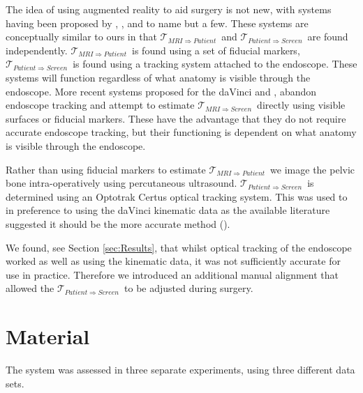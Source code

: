 \documentclass[3p,twocolumn,preprint,10pt]{elsarticle}
\newcommand{\Tpreop}{$\mathcal{T}_{MRI \Rightarrow Patient}$}
\newcommand{\Tlens}{$\mathcal{T}_{Patient \Rightarrow Screen}$}
\newcommand{\Tsystem}{$\mathcal{T}_{MRI \Rightarrow Screen}$}
\begin{document}
The idea of using augmented reality to aid surgery is not 
new, with systems having been proposed by \cite{pap191}, \cite{pap190}, \cite{pap188} 
and \cite{pap210} to name but a few. These systems are conceptually similar to ours 
in that \Tpreop \ and \Tlens \ are found independently. \Tpreop \ is found using
a set of fiducial markers, \Tlens \ is found using a tracking system attached to the endoscope.
These 
systems will function regardless of what anatomy is visible through the endoscope. 
More recent 
systems proposed for the daVinci \cite{pap208} and \cite{pap203}, abandon endoscope tracking and 
attempt to estimate \Tsystem \ directly using visible surfaces or fiducial markers. 
These have the advantage that they do not require accurate endoscope tracking, 
but their functioning is dependent on what anatomy is visible through the endoscope.

Rather than using 
fiducial markers to estimate \Tpreop \ we image the pelvic bone intra-operatively 
using percutaneous ultrasound. \Tlens \ is determined using an Optotrak Certus 
optical tracking system. This was used to in preference to using the 
daVinci kinematic data as the available literature suggested it should be the
more accurate method (\cite{pap171,pap164,pap153}). 

We found, see Section \ref{sec:Results}, that whilst 
optical tracking of the endoscope worked as well as using the kinematic data, it 
was not sufficiently accurate for use in practice. Therefore we introduced an 
additional manual alignment that allowed the \Tlens \ to be adjusted during surgery.


\section{Material}
The system was assessed in three separate experiments, using three different data sets.
\end{document}
